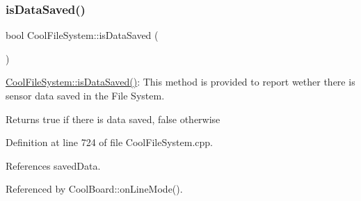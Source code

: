 \subsubsection{\texorpdfstring{is\+Data\+Saved()}{isDataSaved()}}
{\footnotesize\ttfamily bool Cool\+File\+System\+::is\+Data\+Saved (\begin{DoxyParamCaption}{ }\end{DoxyParamCaption})}

\hyperlink{classCoolFileSystem_a5a7eaeea7a9fbf8aaef651d862fa3b5b}{Cool\+File\+System\+::is\+Data\+Saved()}\+: This method is provided to report wether there is sensor data saved in the File System.

\begin{DoxyReturn}{Returns}
true if there is data saved, false otherwise 
\end{DoxyReturn}


Definition at line 724 of file Cool\+File\+System.\+cpp.



References saved\+Data.



Referenced by Cool\+Board\+::on\+Line\+Mode().


